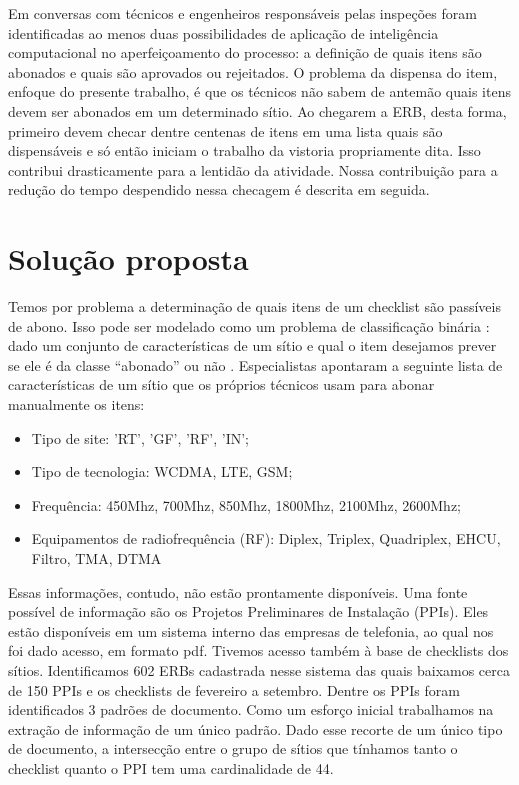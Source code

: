 \documentclass[
	12pt,				%
	openany,			%
	oneside,			%
	a4paper,			%
	english,			%
	french,				%
	spanish,			%
	brazil,				%
	]{abntex2}
\begin{document}
Em conversas com técnicos e engenheiros responsáveis pelas inspeções foram
identificadas ao menos duas possibilidades de aplicação de inteligência
computacional no aperfeiçoamento do processo: a definição de quais itens são
abonados e quais são aprovados ou rejeitados. O problema da dispensa do item,
enfoque do presente trabalho, é que os técnicos não sabem de antemão quais itens
devem ser abonados em um determinado sítio. Ao chegarem a ERB, desta forma,
primeiro devem checar dentre centenas de itens em uma lista quais são
dispensáveis e só então iniciam o trabalho da vistoria propriamente dita. Isso
contribui drasticamente para a lentidão da atividade. Nossa contribuição para a
redução do tempo despendido nessa checagem é descrita em seguida.

\chapter[Solução proposta]{Solução proposta}
Temos por problema a determinação de quais itens de um checklist são passíveis
de abono. Isso pode ser modelado como um problema de classificação binária :
dado um conjunto de características de um sítio e qual o item desejamos prever
se ele é da classe ``abonado'' ou não \cite{james2013introduction}.
Especialistas apontaram a seguinte lista de características de um sítio que os
próprios técnicos usam para abonar manualmente os itens:

\begin{itemize}
\item Tipo de site: 'RT', 'GF', 'RF', 'IN'; 
\item Tipo de tecnologia: WCDMA, LTE, GSM;
\item Frequência: 450Mhz, 700Mhz, 850Mhz, 1800Mhz,  2100Mhz, 2600Mhz;
\item Equipamentos de radiofrequência (RF): Diplex, Triplex, Quadriplex, EHCU, Filtro, TMA, DTMA
\end{itemize}

Essas informações, contudo, não estão prontamente disponíveis. Uma fonte
possível de informação são os Projetos Preliminares de Instalação (PPIs). Eles
estão disponíveis em um sistema interno das empresas de telefonia, ao qual nos
foi dado acesso, em formato pdf. Tivemos acesso também à base de checklists dos
sítios. Identificamos 602 ERBs cadastrada nesse sistema das quais baixamos cerca
de 150 PPIs e os checklists de fevereiro a setembro. Dentre os PPIs foram
identificados 3 padrões de documento. Como um esforço inicial trabalhamos na
extração de informação de um único padrão. Dado esse recorte de um único tipo de
documento, a intersecção entre o grupo de sítios que tínhamos tanto o checklist
quanto o PPI tem uma cardinalidade de 44.
\end{document}
